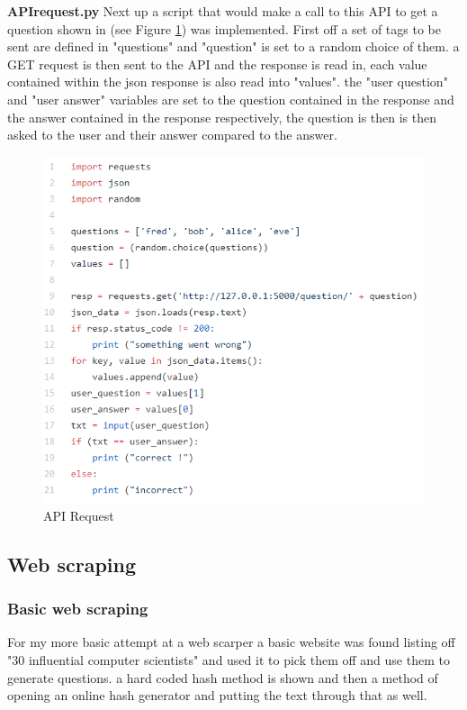 \documentclass[12pt,a4paper]{article}
\begin{document}
\textbf{API\textunderscore request.py} 
Next up a script that would make a call to this API to get a question shown in (see Figure \ref{API request}) was implemented. First off a set of tags to be sent are defined in "questions" and "question" is set to a random choice of them. a GET request is then sent to the API and the response is read in, each value contained within the json response is also read into "values". the "user question" and "user answer" variables are set to the question contained in the response and the answer contained in the response respectively, the question is then is then asked to the user and their answer compared to the answer. 

\begin{figure}[!ht]
    \centering
    \includegraphics[width=1.0\textwidth]{Figs/API request.PNG} 
    \caption{API Request} 
    \label{API request}
\end{figure}

\subsection{Web scraping} 
\subsubsection{Basic web scraping}   
For my more basic attempt at a web scarper a basic website was found listing off "30 influential computer scientists" and used it to pick them off and use them to generate questions. a hard coded hash method is shown and then a method of opening an online hash generator and putting the text through that as well. 
\end{document}
